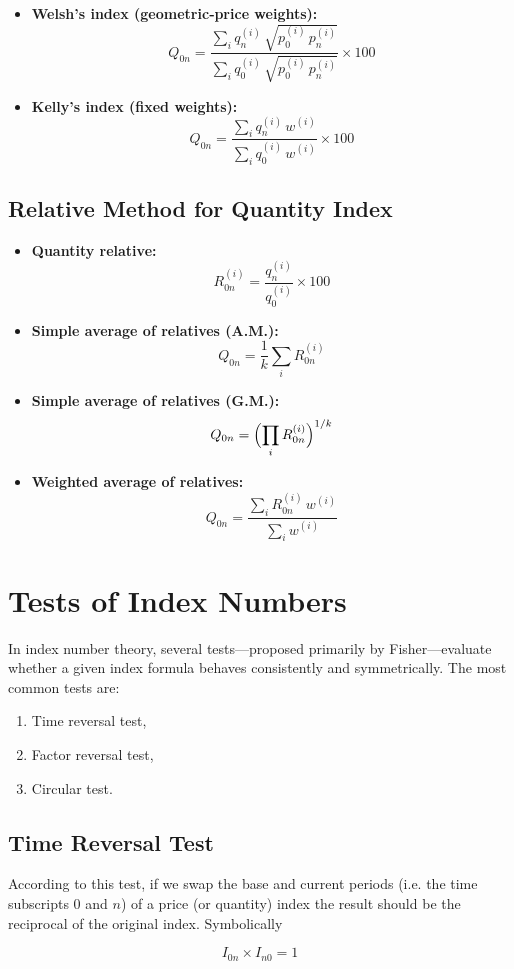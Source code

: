 \documentclass[twoside]{book}
\begin{document}
\begin{itemize}
    \item \textbf{Welsh's index (geometric‐price weights):}
    $$
    Q_{0n} = \frac{\displaystyle\sum_i q_n^{(i)}\,\sqrt{p_0^{(i)}\,p_n^{(i)}}}
                  {\displaystyle\sum_i q_0^{(i)}\,\sqrt{p_0^{(i)}\,p_n^{(i)}}}
    \times 100
    $$

    \item \textbf{Kelly's index (fixed weights):}
    $$
    Q_{0n} = \frac{\displaystyle\sum_i q_n^{(i)}\,w^{(i)}}{\sum_i q_0^{(i)}\,w^{(i)}} \times 100
    $$
\end{itemize}

\subsection{Relative Method for Quantity Index}

\begin{itemize}
    \item \textbf{Quantity relative:}
    $$
    R_{0n}^{(i)} = \frac{q_n^{(i)}}{q_0^{(i)}} \times 100
    $$

    \item \textbf{Simple average of relatives (A.M.):}
    $$
    Q_{0n} = \frac{1}{k} \sum_i R_{0n}^{(i)}
    $$

    \item \textbf{Simple average of relatives (G.M.):}
    $$
    Q_{0n} = \Bigl(\prod_i R_{0n}^{(i)}\Bigr)^{1/k}
    $$

    \item \textbf{Weighted average of relatives:}
    $$
    Q_{0n} = \frac{\sum_i R_{0n}^{(i)}\,w^{(i)}}{\sum_i w^{(i)}}
    $$
\end{itemize}

\section{Tests of Index Numbers}

In index number theory, several tests—proposed primarily by Fisher—evaluate whether a given index formula behaves consistently and symmetrically. The most common tests are:

\begin{enumerate}
\item Time reversal test,
\item Factor reversal test,
\item Circular test.
\end{enumerate}

\subsection{Time Reversal Test}
According to this test, if we swap the base and current periods (i.e. the time subscripts 0 and $n$) of a price (or quantity) index the result should be the reciprocal of the original index. Symbolically
\begin{textbox}
\[
   I_{0n} \times I_{n0} = 1
\]
\end{textbox}
\end{document}
